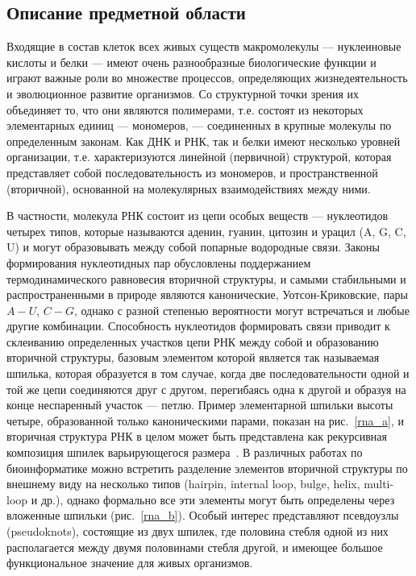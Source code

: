 \label{sec:relatedworks}
\subsection{Описание предметной области}
Входящие в состав клеток всех живых существ макромолекулы --- нуклеиновые кислоты и белки --- имеют очень разнообразные биологические функции и играют важные роли во множестве процессов, определяющих жизнедеятельность и эволюционное развитие организмов. Со структурной точки зрения их объединяет то, что они являются полимерами, т.е. состоят из некоторых элементарных единиц --- мономеров, --- соединенных в крупные молекулы по определенным законам.  Как ДНК и РНК, так и белки имеют несколько уровней организации, т.е. характеризуются линейной (первичной) структурой, которая представляет собой последовательность из мономеров, и пространственной (вторичной), основанной на молекулярных взаимодействиях между ними. 

В частности, молекула РНК состоит из цепи особых веществ --- нуклеотидов четырех типов, которые называются аденин, гуанин, цитозин и урацил (A, G, C, U) и могут образовывать между собой попарные водородные связи. Законы формирования нуклеотидных пар обусловлены поддержанием термодинамического равновесия вторичной структуры, и самыми стабильными и распространенными в природе являются канонические, Уотсон-Криковские, пары $A-U$, $C-G$, однако с разной степенью вероятности могут встречаться и любые другие комбинации. Способность нуклеотидов формировать связи приводит к склеиванию определенных участков цепи РНК между собой и образованию вторичной структуры, базовым элементом которой является так называемая шпилька, которая образуется в том случае, когда две последовательности одной и той же цепи соединяются друг с другом, перегибаясь одна к другой и образуя на конце неспаренный участок --- петлю. Пример элементарной шпильки высоты четыре, образованной только каноническими парами, показан на рис.~\ref{rna_a}, и вторичная структура РНК в целом может быть представлена как рекурсивная композиция шпилек варьирующегося размера~\cite{quadrini2019loop}. В различных работах по биоинформатике можно встретить разделение элементов вторичной структуры по внешнему виду на несколько типов (hairpin, internal loop, bulge, helix, multi-loop и др.), однако формально все эти элементы могут быть определены через вложенные шпильки (рис.~\ref{rna_b}). Особый интерес представляют псевдоузлы (pseudoknots), состоящие из двух шпилек, где половина стебля одной из них располагается между двумя половинами стебля другой, и имеющее большое функциональное значение для живых организмов. 

